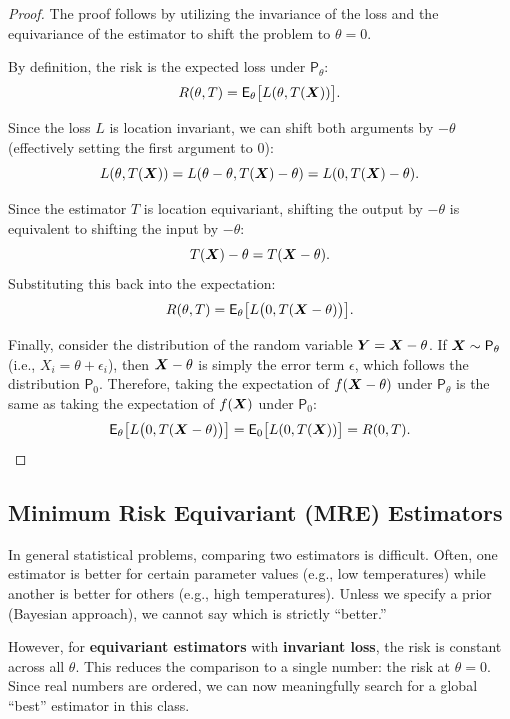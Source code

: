 \begin{proof}
The proof follows by utilizing the invariance of the loss and the equivariance of the estimator to shift the problem to \(\theta=0\).

By definition, the risk is the expected loss under \(\mathsf{P}_\theta\):
\[ R(\theta, T) = \mathsf{E}_{\theta} \big[ L(\theta, T(\boldsymbol{X})) \big]. \]

Since the loss \(L\) is location invariant, we can shift both arguments by \(-\theta\) (effectively setting the first argument to 0):
\[ L(\theta, T(\boldsymbol{X})) = L(\theta - \theta, T(\boldsymbol{X}) - \theta) = L(0, T(\boldsymbol{X}) - \theta). \]

Since the estimator \(T\) is location equivariant, shifting the output by \(-\theta\) is equivalent to shifting the input by \(-\theta\):
\[ T(\boldsymbol{X}) - \theta = T(\boldsymbol{X} - \theta). \]
Substituting this back into the expectation:
\[ R(\theta, T) = \mathsf{E}_{\theta} \big[ L \big( 0, T(\boldsymbol{X} - \theta) \big) \big]. \]

Finally, consider the distribution of the random variable \(\boldsymbol{Y} = \boldsymbol{X} - \theta\). If \(\boldsymbol{X} \sim \mathsf{P}_{\theta}\) (i.e., \(X_i = \theta + \epsilon_i\)), then \(\boldsymbol{X} - \theta\) is simply the error term \(\epsilon\), which follows the distribution \(\mathsf{P}_0\). Therefore, taking the expectation of \(f(\boldsymbol{X} - \theta)\) under \(\mathsf{P}_{\theta}\) is the same as taking the expectation of \(f(\boldsymbol{X})\) under \(\mathsf{P}_0\):
\[ \mathsf{E}_{\theta} \big[ L \big( 0, T(\boldsymbol{X} - \theta) \big) \big] = \mathsf{E}_{0} \big[ L(0, T(\boldsymbol{X})) \big] = R(0, T). \]
\end{proof}

\subsection{Minimum Risk Equivariant (MRE) Estimators}
\label{sub:mre_estimators}

In general statistical problems, comparing two estimators is difficult. Often, one estimator is better for certain parameter values (e.g., low temperatures) while another is better for others (e.g., high temperatures). Unless we specify a prior (Bayesian approach), we cannot say which is strictly ``better.''

However, for \textbf{equivariant estimators} with \textbf{invariant loss}, the risk is constant across all \(\theta\). This reduces the comparison to a single number: the risk at \(\theta = 0\). Since real numbers are ordered, we can now meaningfully search for a global ``best'' estimator in this class.

